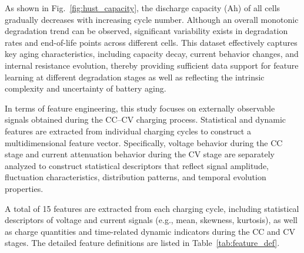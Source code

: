 \documentclass[a4paper,fleqn]{cas-dc}
\begin{document}
As shown in Fig.~\ref{fig:hust_capacity}, the discharge capacity (Ah) of all cells gradually decreases with increasing cycle number. Although an overall monotonic degradation trend can be observed, significant variability exists in degradation rates and end-of-life points across different cells. This dataset effectively captures key aging characteristics, including capacity decay, current behavior changes, and internal resistance evolution, thereby providing sufficient data support for feature learning at different degradation stages as well as reflecting the intrinsic complexity and uncertainty of battery aging.

In terms of feature engineering, this study focuses on externally observable signals obtained during the CC--CV charging process. Statistical and dynamic features are extracted from individual charging cycles to construct a multidimensional feature vector. Specifically, voltage behavior during the CC stage and current attenuation behavior during the CV stage are separately analyzed to construct statistical descriptors that reflect signal amplitude, fluctuation characteristics, distribution patterns, and temporal evolution properties.

A total of 15 features are extracted from each charging cycle, including statistical descriptors of voltage and current signals (e.g., mean, skewness, kurtosis), as well as charge quantities and time-related dynamic indicators during the CC and CV stages. The detailed feature definitions are listed in Table~\ref{tab:feature_def}.
\end{document}
